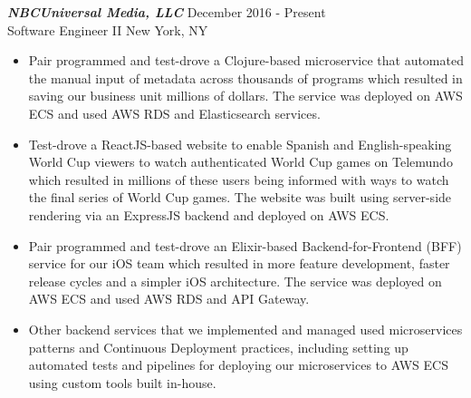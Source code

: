 {\sl \textbf{NBCUniversal Media, LLC}} \hfill December 2016 - Present \\ Software Engineer II \hfill New York, NY
\begin{itemize}
\item Pair programmed and test-drove a Clojure-based microservice that automated the manual input of metadata across thousands of programs which resulted in saving our business unit millions of dollars. The service was deployed on AWS ECS and used AWS RDS and Elasticsearch services.
\item Test-drove a ReactJS-based website to enable Spanish and English-speaking World Cup viewers to watch authenticated World Cup games on Telemundo which resulted in millions of these users being informed with ways to watch the final series of World Cup games. The website was built using server-side rendering via an ExpressJS backend and deployed on AWS ECS.
\item Pair programmed and test-drove an Elixir-based Backend-for-Frontend (BFF) service for our iOS team which resulted in more feature development, faster release cycles and a simpler iOS architecture. The service was deployed on AWS ECS and used AWS RDS and API Gateway.
\item Other backend services that we implemented and managed used microservices patterns and Continuous Deployment practices, including setting up automated tests and pipelines for deploying our microservices to AWS ECS using custom tools built in-house.
\end{itemize}

